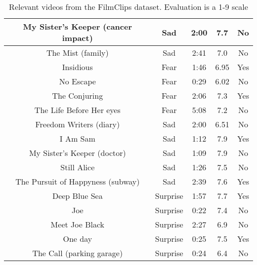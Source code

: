 \begin{table}[]
\begin{tabular}{|c|c|c|c|c|}
          My Sister's Keeper (cancer impact) & Sad & 2:00 & 7.7  & No \\ \hline
          The Mist (family) & Sad & 2:41 & 7.0  & No \\ \hline
          Insidious & Fear & 1:46 & 6.95  & Yes \\ \hline
          No Escape & Fear & 0:29 & 6.02  & No \\ \hline
          The Conjuring & Fear & 2:06 & 7.3  & Yes \\ \hline
          The Life Before Her eyes & Fear & 5:08 & 7.2  & No \\ \hline
          Freedom Writers (diary) & Sad & 2:00 & 6.51  & No \\ \hline
          I Am Sam & Sad & 1:12 & 7.9  & Yes \\ \hline
          My Sister's Keeper (doctor)  & Sad & 1:09 & 7.9  & No \\ \hline
          Still Alice & Sad & 1:26 & 7.5  & No \\ \hline
          The Pursuit of Happyness (subway) & Sad & 2:39 & 7.6  & Yes \\ \hline
          Deep Blue Sea & Surprise & 1:57 & 7.7  & Yes \\ \hline
          Joe & Surprise & 0:22 & 7.4  & No \\ \hline
          Meet Joe Black & Surprise & 2:27 & 6.9  & No \\ \hline
          One day & Surprise & 0:25 & 7.5  & Yes \\ \hline
          The Call (parking garage) & Surprise & 0:24 & 6.4  & No \\ \hline
    \end{tabular}
    \caption{Relevant videos from the FilmClips dataset. Evaluation is a 1-9 scale \cite{FilmClips}}
    \label{tab:filmclips}
\end{table}


